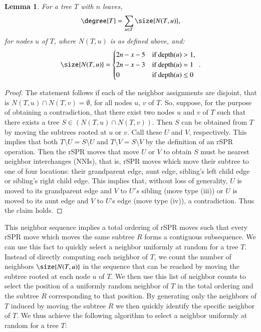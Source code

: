 \documentclass[]{elsarticle}
\newtheorem{lem}[thm]{Lemma}
\begin{document}
\begin{lem}
	\label{lem:compute_degree}
	For a tree $T$ with $n$ leaves,
	$$\degree{T} = \sum_{u \in T} \size{N(T,u)},$$
	for nodes $u$ of $T$, where $N(T,u)$ is as defined above, and:
	$$\size{N(T,u)} = \begin{cases}
		2n - x - 5 &\text{if depth($u$) $ > 1$, } \\
		2n - x - 3 &\text{if depth($u$) $ = 1$ } \\
		0 &\text{if depth($u$) $ \le 0$ } \\
	\end{cases}.$$
\end{lem}
\begin{proof}
	The statement follows if each of the neighbor assignments are disjoint, that is $N(T,u) \cap N(T,v) = \emptyset$, for all nodes $u$, $v$ of $T$.
	So, suppose, for the purpose of obtaining a contradiction, that there exist two nodes $u$ and $v$ of $T$ such that there exists a tree $S \in (N(T,u) \cap N(T,v))$.
	Then $S$ can be obtained from $T$ by moving the subtrees rooted at $u$ or $v$.
	Call these $U$ and $V$, respectively.
	This implies that both $T \setminus U = S \setminus U$ and $T \setminus V = S \setminus V$ by the definition of an rSPR operation.
	Then the rSPR moves that move $U$ or $V$ to obtain $S$ must be nearest neighbor interchanges (NNIs), that is, rSPR moves which move their subtree to one of four locations: their grandparent edge, aunt edge, sibling's left child edge or sibling's right child edge.
	This implies that, without loss of generality, $U$ is moved to its grandparent edge and $V$ to $U's$ sibling (move type (iii)) or $U$ is moved to its aunt edge and $V$ to $U$'s edge (move type (iv)), a contradiction.
	Thus the claim holds.
\end{proof}



This neighbor sequence implies a total ordering of rSPR moves such that every rSPR move which moves the same subtree $R$ forms a contiguous subsequence.
We can use this fact to quickly select a neighbor uniformly at random for a tree $T$.
Instead of directly computing each neighbor of $T$, we count the number of neighbors $\size{N(T,u)}$ in the sequence that can be reached by moving the subtree rooted at each node $u$ of $T$.
We then use this list of neighbor counts to select the position of a uniformly random neighbor of $T$ in the total ordering and the subtree $R$ corresponding to that position.
By generating only the neighbors of $T$ induced by moving the subtree $R$ we then quickly identify the specific neighbor of $T$.
We thus achieve the following algorithm to select a neighbor uniformly at random for a tree $T$:
\end{document}
